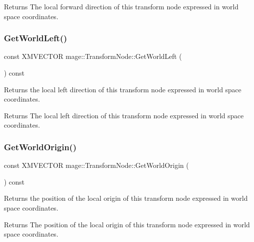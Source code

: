\begin{DoxyReturn}{Returns}
The local forward direction of this transform node expressed in world space coordinates. 
\end{DoxyReturn}
\hypertarget{structmage_1_1_transform_node_af021782ea162e0aa8c891b794d204632}{}\label{structmage_1_1_transform_node_af021782ea162e0aa8c891b794d204632} 
\subsubsection{\texorpdfstring{Get\+World\+Left()}{GetWorldLeft()}}
{\footnotesize\ttfamily const X\+M\+V\+E\+C\+T\+OR mage\+::\+Transform\+Node\+::\+Get\+World\+Left (\begin{DoxyParamCaption}{ }\end{DoxyParamCaption}) const\hspace{0.3cm}{\ttfamily [noexcept]}}

Returns the local left direction of this transform node expressed in world space coordinates.

\begin{DoxyReturn}{Returns}
The local left direction of this transform node expressed in world space coordinates. 
\end{DoxyReturn}
\hypertarget{structmage_1_1_transform_node_a481e03769590d147bbdf7dedf56a6e65}{}\label{structmage_1_1_transform_node_a481e03769590d147bbdf7dedf56a6e65} 
\subsubsection{\texorpdfstring{Get\+World\+Origin()}{GetWorldOrigin()}}
{\footnotesize\ttfamily const X\+M\+V\+E\+C\+T\+OR mage\+::\+Transform\+Node\+::\+Get\+World\+Origin (\begin{DoxyParamCaption}{ }\end{DoxyParamCaption}) const\hspace{0.3cm}{\ttfamily [noexcept]}}

Returns the position of the local origin of this transform node expressed in world space coordinates.

\begin{DoxyReturn}{Returns}
The position of the local origin of this transform node expressed in world space coordinates. 
\end{DoxyReturn}
\hypertarget{structmage_1_1_transform_node_abdad2523f50f398977abf8dd6c166d89}{}\label{structmage_1_1_transform_node_abdad2523f50f398977abf8dd6c166d89} 
